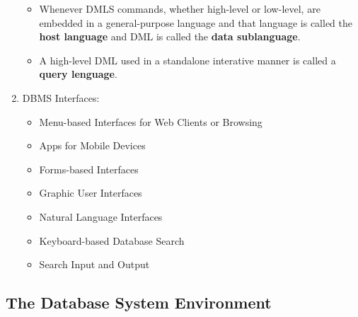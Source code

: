 \documentclass[10pt]{article}
\begin{document}
\begin{enumerate}
\begin{itemize}
		\item Whenever DMLS commands, whether high-level or low-level, are embedded in a general-purpose language and that language is called the \textbf{host language} and DML is called the \textbf{data sublanguage}.
		\item A high-level DML used in a standalone interative manner is called a \textbf{query lenguage}.
	\end{itemize}

	\item DBMS Interfaces:
	\begin{itemize}
		\item Menu-based Interfaces for Web Clients or Browsing
		\item Apps for Mobile Devices
		\item Forms-based Interfaces
		\item Graphic User Interfaces
		\item Natural Language Interfaces
		\item Keyboard-based Database Search
		\item Search Input and Output
	\end{itemize}
\end{enumerate}

\subsection{The Database System Environment}

 
\end{document}
